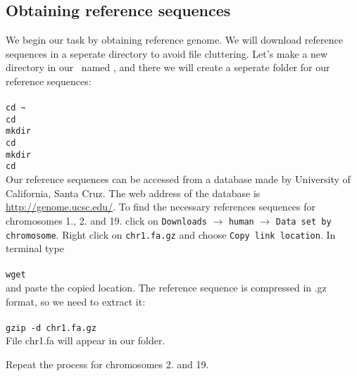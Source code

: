\subsection{Obtaining reference sequences}
We begin our task by obtaining reference genome. We will download reference
sequences in a seperate directory to avoid file cluttering. Let's make
a new directory in our \texttt{\workDir}~named \texttt{\reseqDir}, and there we will create
a seperate folder \texttt{} for our reference sequences:\\~\\
\texttt{cd \textasciitilde}\\
\texttt{cd \workDir}\\
\texttt{mkdir \reseqDir}\\
\texttt{cd \reseqDir}\\
\texttt{mkdir }\\
\texttt{cd }\\

Our reference sequences can be accessed from a database made by
University of California, Santa Cruz.
The web address of the database is \url{http://genome.ucsc.edu/}.
To find the necessary references sequences for chromosomes 1., 2. and 19.
click on \texttt{Downloads} $\rightarrow$ \texttt{human} $\rightarrow$
\texttt{Data set by chromosome}. Right click on \texttt{chr1.fa.gz}
and choose \texttt{Copy link location}. In terminal type\\~\\
\texttt{wget} \\

and paste the copied location. The reference sequence is compressed in .gz
format, so we need to extract it:\\~\\
\texttt{gzip -d chr1.fa.gz}\\

File chr1.fa will appear in our folder.

Repeat the process for chromosomes 2. and 19.

